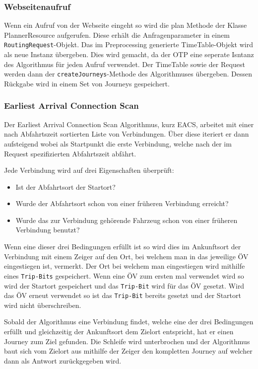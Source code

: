 \subsubsection{Webseitenaufruf}
Wenn ein Aufruf von der Webseite eingeht so wird die plan Methode der Klasse PlannerResource aufgerufen. Diese erhält die Anfragenparameter in einem \texttt{RoutingRequest}-Objekt. Das im Preprocessing generierte TimeTable-Objekt wird als neue Instanz übergeben. Dies wird gemacht, da der OTP eine seperate Isntanz des Algorithmus für jeden Aufruf verwendet. Der TimeTable sowie der Request werden dann der \texttt{createJourneys}-Methode des Algorithmuses übergeben. Dessen Rückgabe wird in einem Set von Journeys gespeichert.


\subsubsection{Earliest Arrival Connection Scan}
Der Earliest Arrival Connection Scan Algorithmus, kurz EACS, arbeitet mit einer nach Abfahrtszeit sortierten Liste von Verbindungen. Über diese iteriert er dann aufsteigend wobei als Startpunkt die erste Verbindung, welche nach der im Request spezifizierten Abfahrtszeit abfährt. 

Jede Verbindung wird auf drei Eigenschaften überprüft:
\begin{itemize}
	\item Ist der Abfahrtsort der Startort?
	\item Wurde der Abfahrtsort schon von einer früheren Verbindung erreicht?
	\item Wurde das zur Verbindung gehörende Fahrzeug schon von einer früheren Verbindung benutzt?
\end{itemize}
Wenn eine dieser drei Bedingungen erfüllt ist so wird dies im Ankunftsort der Verbindung mit einem Zeiger auf den Ort, bei welchem man in das jeweilige ÖV eingestiegen ist, vermerkt. Der Ort bei welchem man eingestiegen wird mithilfe eines \texttt{Trip-Bits} gespeichert. Wenn eine ÖV zum ersten mal verwendet wird so wird der Startort gespeichert und das \texttt{Trip-Bit} wird für das ÖV gesetzt. Wird das ÖV erneut verwendet so ist das \texttt{Trip-Bit} bereits gesetzt und der Startort wird nicht überschreiben. 

Sobald der Algorithmus eine Verbindung findet, welche eine der drei Bedingungen erfüllt und gleichzeitig der Ankunftsort dem Zielort entspricht, hat er einen Journey zum Ziel gefunden. Die Schleife wird unterbrochen und der Algorithmus baut sich vom Zielort aus mithilfe der Zeiger den kompletten Journey auf welcher dann als Antwort zurückgegeben wird.

